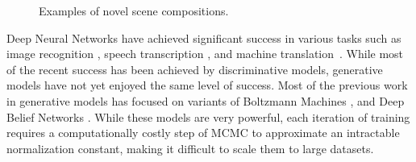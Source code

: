 \documentclass{article} %
\begin{document}
\begin{figure}[!t]
\captionsetup[subfigure]{labelformat=empty}
\vspace{-0.3cm}
\begin{center}
\quad
%
\quad
%
\quad
%
\quad
%
\end{center}
\caption{Examples of novel scene compositions.}
\label{fig:genimages4}
\vspace{-0.3cm}
\end{figure}

Deep Neural Networks have achieved significant success in various tasks such as image recognition \citep{krizhevsky_imagenet}, speech transcription \citep{graves_speech}, and machine 
translation~\citep{bahdanau_mt}. 
While most of the recent success has been achieved by discriminative models, generative models have not yet enjoyed the same level of success. Most of the previous work in generative models has focused on variants of Boltzmann Machines \citep{smolensky_rbm}, \citep{russ_dbm} and Deep Belief Networks \citep{hinton_dbn}. While these models are very powerful, each iteration of training requires a computationally costly step of MCMC to approximate an intractable normalization constant, making it difficult to scale them to large datasets.
\end{document}
